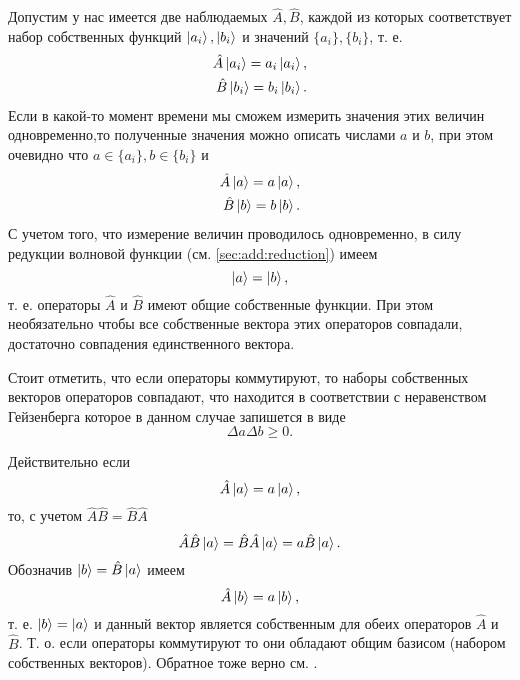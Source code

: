Допустим у нас имеется две наблюдаемых $\hat{A}, \hat{B}$, каждой из
которых соответствует набор собственных функций $\ket{a_i},
\ket{b_i}$ и значений $\{a_i\}, \{b_i\}$, т. е.
\begin{eqnarray}
  \hat{A}\ket{a_i} = a_i \ket{a_i},
  \nonumber \\
  \hat{B}\ket{b_i} = b_i \ket{b_i}.
  \nonumber
\end{eqnarray}
Если в какой-то момент времени мы сможем измерить значения этих
величин одновременно,то полученные значения можно описать числами $a$
и $b$, при этом очевидно что $a \in \{a_i\}, b \in \{b_i\}$ и
\begin{eqnarray}
  \hat{A}\ket{a} = a \ket{a},
  \nonumber \\
  \hat{B}\ket{b} = b \ket{b}.
  \nonumber
\end{eqnarray}
С учетом того, что измерение величин проводилось одновременно, в силу
редукции волновой функции (см. \autoref{sec:add:reduction}) имеем
\[
\ket{a} = \ket{b},
\]
т. е. операторы $\hat{A}$ и $\hat{B}$ имеют общие собственные
функции. При этом необязательно чтобы все собственные вектора этих
операторов совпадали, достаточно совпадения единственного вектора.

Стоит отметить, что если операторы коммутируют, то наборы собственных
векторов операторов совпадают, что находится в соответствии с
неравенством Гейзенберга которое в данном случае запишется в виде
\[
\Delta a \Delta b \ge 0.
\]

Действительно если
\[
\hat{A} \ket{a} = a \ket{a}, 
\]
то, с учетом $\hat{A}\hat{B} = \hat{B}\hat{A}$
\[
\hat{A}\hat{B}\ket{a} = 
\hat{B}\hat{A}\ket{a} =
a \hat{B}\ket{a}.
\]
Обозначив $\ket{b} = \hat{B}\ket{a}$ имеем
\[
\hat{A}\ket{b} = 
a \ket{b},
\]
т. е.
$\ket{b} = \ket{a}$ и данный вектор является собственным
для обеих операторов $\hat{A}$ и  $\hat{B}$. Т. о. если операторы
коммутируют то они обладают общим базисом (набором собственных
векторов). Обратное тоже верно см. \cite{bHolevo2016}.
